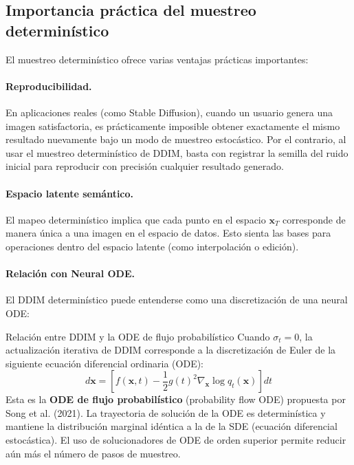 \documentclass[a4paper]{article}
\begin{document}
\subsection{Importancia práctica del muestreo determinístico}

El muestreo determinístico ofrece varias ventajas prácticas importantes:

\paragraph{Reproducibilidad.} En aplicaciones reales (como Stable Diffusion), cuando un usuario genera una imagen satisfactoria, es prácticamente imposible obtener exactamente el mismo resultado nuevamente bajo un modo de muestreo estocástico. Por el contrario, al usar el muestreo determinístico de DDIM, basta con registrar la semilla del ruido inicial para reproducir con precisión cualquier resultado generado.

\paragraph{Espacio latente semántico.} El mapeo determinístico implica que cada punto en el espacio $\mathbf{x}_T$ corresponde de manera única a una imagen en el espacio de datos. Esto sienta las bases para operaciones dentro del espacio latente (como interpolación o edición).

\paragraph{Relación con Neural ODE.} El DDIM determinístico puede entenderse como una discretización de una neural ODE:

\begin{knowledgebox}{Relación entre DDIM y la ODE de flujo probabilístico}
Cuando $\sigma_t = 0$, la actualización iterativa de DDIM corresponde a la discretización de Euler de la siguiente ecuación diferencial ordinaria (ODE):
$$
d\mathbf{x} = \left[f(\mathbf{x}, t) - \frac{1}{2}g(t)^2 \nabla_\mathbf{x} \log q_t(\mathbf{x})\right] dt
$$
Esta es la \textbf{ODE de flujo probabilístico} (probability flow ODE) propuesta por Song et al. (2021). La trayectoria de solución de la ODE es determinística y mantiene la distribución marginal idéntica a la de la SDE (ecuación diferencial estocástica). El uso de solucionadores de ODE de orden superior permite reducir aún más el número de pasos de muestreo.
\end{knowledgebox}
\end{document}
